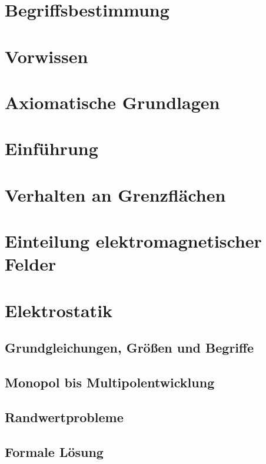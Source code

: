 
\usepackage{pdfpages}

 
\section{Begriffsbestimmung}

\section{Vorwissen}

\section{Axiomatische Grundlagen}

\section{Einführung}

\section{Verhalten an Grenzflächen}

\section{Einteilung elektromagnetischer Felder}

\section{Elektrostatik}
\subsection{Grundgleichungen, Größen und Begriffe}

\subsection{Monopol bis Multipolentwicklung}

\subsection{Randwertprobleme}

\subsection{Formale Lösung}

